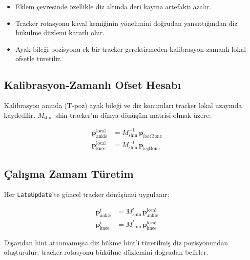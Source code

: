 \documentclass[11pt,a4paper]{article}
\begin{document}
\begin{itemize}[nosep]
    \item Eklem \c{c}evresinde \"{o}zellikle diz alt{\i}nda
          deri kayma artefakt{\i} azal{\i}r.
    \item Tracker rotasyonu kaval kemi\u{g}inin y\"{o}nelimini
          do\u{g}rudan yans{\i}tt{\i}\u{g}{\i}ndan diz b\"uk\"ulme
          d\"uzlemi kararl{\i} olur.
    \item Ayak bile\u{g}i pozisyonu ek bir tracker gerektirmeden
          kalibrasyon-zamanl{\i} lokal ofsetle t\"uretilir.
\end{itemize}

\subsection{Kalibrasyon-Zamanl{\i} Ofset Hesab{\i}}

Kalibrasyon an{\i}nda (T-poz) ayak bile\u{g}i ve diz konumlar{\i}
tracker lokal uzay{\i}nda kaydedilir. $M_{\text{shin}}$ shin
tracker'{\i}n d\"unya d\"on\"u\c{s}\"um matrisi olmak \"uzere:

\begin{align}
    \mathbf{p}_{\text{ankle}}^{\text{local}}
    &= M_{\text{shin}}^{-1}\,\mathbf{p}_{\text{footBone}}
    \label{eq:shin_ankle} \\
    \mathbf{p}_{\text{knee}}^{\text{local}}
    &= M_{\text{shin}}^{-1}\,\mathbf{p}_{\text{legBone}}
    \label{eq:shin_knee}
\end{align}

\subsection{\c{C}al{\i}\c{s}ma Zaman{\i} T\"uretim}

Her \texttt{LateUpdate}'te g\"uncel tracker d\"{o}n\"u\c{s}\"um\"u uygulan{\i}r:

\begin{align}
    \mathbf{p}_{\text{ankle}}^{t}
    &= M_{\text{shin}}^{t}\,\mathbf{p}_{\text{ankle}}^{\text{local}}
    \label{eq:sh_rt_ankle} \\
    \mathbf{p}_{\text{knee}}^{t}
    &= M_{\text{shin}}^{t}\,\mathbf{p}_{\text{knee}}^{\text{local}}
    \label{eq:sh_rt_knee}
\end{align}

D{\i}\c{s}ar{\i}dan hint atanmam{\i}\c{s}sa diz b\"ukme hint'i
t\"uretilmi\c{s} diz pozisyonundan olu\c{s}turulur; tracker
rotasyonu b\"uk\"ulme d\"uzlemini do\u{g}rudan belirler.
\end{document}
